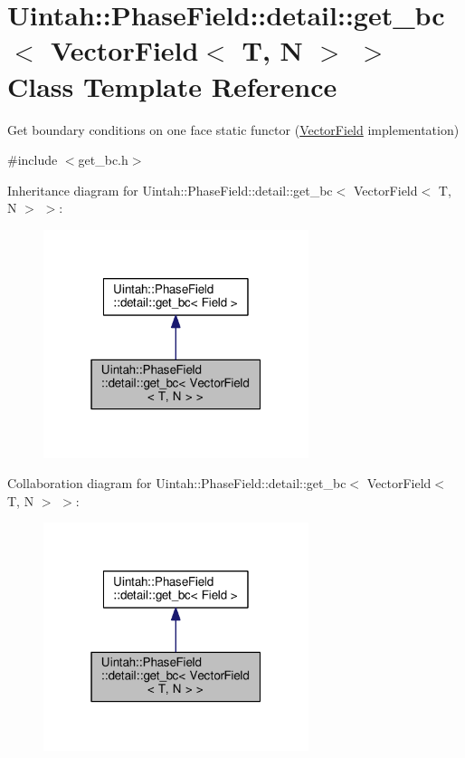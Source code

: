 \hypertarget{classUintah_1_1PhaseField_1_1detail_1_1get__bc_3_01VectorField_3_01T_00_01N_01_4_01_4}{}\section{Uintah\+:\+:Phase\+Field\+:\+:detail\+:\+:get\+\_\+bc$<$ Vector\+Field$<$ T, N $>$ $>$ Class Template Reference}
\label{classUintah_1_1PhaseField_1_1detail_1_1get__bc_3_01VectorField_3_01T_00_01N_01_4_01_4}


Get boundary conditions on one face static functor (\hyperlink{structUintah_1_1PhaseField_1_1VectorField}{Vector\+Field} implementation)  




{\ttfamily \#include $<$get\+\_\+bc.\+h$>$}



Inheritance diagram for Uintah\+:\+:Phase\+Field\+:\+:detail\+:\+:get\+\_\+bc$<$ Vector\+Field$<$ T, N $>$ $>$\+:\nopagebreak
\begin{figure}[H]
\begin{center}
\leavevmode
\includegraphics[width=220pt]{classUintah_1_1PhaseField_1_1detail_1_1get__bc_3_01VectorField_3_01T_00_01N_01_4_01_4__inherit__graph}
\end{center}
\end{figure}


Collaboration diagram for Uintah\+:\+:Phase\+Field\+:\+:detail\+:\+:get\+\_\+bc$<$ Vector\+Field$<$ T, N $>$ $>$\+:\nopagebreak
\begin{figure}[H]
\begin{center}
\leavevmode
\includegraphics[width=220pt]{classUintah_1_1PhaseField_1_1detail_1_1get__bc_3_01VectorField_3_01T_00_01N_01_4_01_4__coll__graph}
\end{center}
\end{figure}
